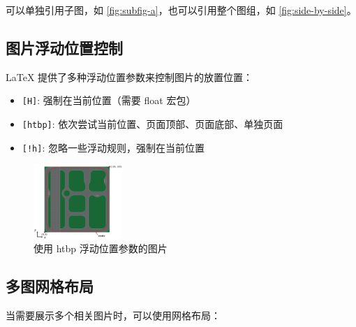 \documentclass[../main]{subfiles}
\begin{document}
可以单独引用子图，如 \cref{fig:subfig-a}，也可以引用整个图组，如 \cref{fig:side-by-side}。

\subsection{图片浮动位置控制}
LaTeX 提供了多种浮动位置参数来控制图片的放置位置：
\begin{itemize}
    \item \texttt{[H]}: 强制在当前位置（需要 float 宏包）
    \item \texttt{[htbp]}: 依次尝试当前位置、页面顶部、页面底部、单独页面
    \item \texttt{[!h]}: 忽略一些浮动规则，强制在当前位置
\end{itemize}

\begin{figure}[htbp]
    \centering
    \includegraphics[width=0.3\textwidth]{figure/template/2025-05-27 082408.png}
    \caption{使用 htbp 浮动位置参数的图片}
    \label{fig:float-example}
\end{figure}

\subsection{多图网格布局}
当需要展示多个相关图片时，可以使用网格布局：
\end{document}
